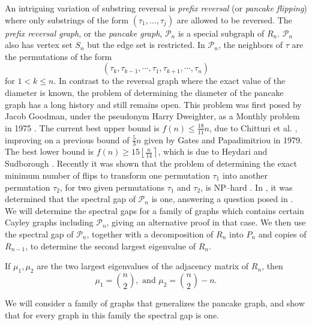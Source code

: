  An intriguing variation of substring reversal is  {\it prefix reversal} (or {\it pancake flipping}) where only
 substrings of the form $(\tau_1, \ldots, \tau_j)$ are allowed to be reversed.
The \textit{prefix reversal graph}, or  the \textit{pancake graph}, $\mathcal{P}_n$ 
is a special subgraph of $R_n$.  ${\mathcal P}_n$  also has vertex set $S_n$  but
the edge set is  restricted. In $\mathcal{P}_n$, the 
neighbors of $\tau$ are the permutations of the form  
 \[ (\tau_k, \tau_{k-1}, \cdots, \tau_1, \tau_{k+1}, \cdots, \tau_n) \]
for $1 < k \leq n$.
 In contrast to the reversal graph
where the exact value of the diameter is known, the problem of determining the diameter of the pancake  
graph has a long history and still remains open.
This problem was first posed by Jacob Goodman, under the pseudonym Harry Dweighter, as a Monthly problem
in 1975 \cite{Dweighter1975}.
The current best upper bound is $f(n) \leq \frac{18}{11} n $, due to
Chitturi et al. \cite{ChitturiEtAl2009}, improving on a previous bound of $\frac{5}{3} n$ given by
 Gates and Papadimitriou \cite{GatesPapadimitriou1979} in 1979.  The best lower bound is
$f(n) \geq 15 \left\lfloor \frac{n}{14} \right\rceil$, which is due to 
Heydari and Sudborough \cite{HeydariSudborough1997}.  Recently it was shown that the problem of  determining the exact minimum number of flips
to transform  one permutation $\tau_1$ into another permutation $\tau_2$, for two
given permutations $\tau_1$ and $\tau_2$, is NP--hard \cite{BulteauEtAl2015}.
  In \cite{Cesi2009}, it 
was determined that the spectral gap of $\mathcal{P}_n$ is one, answering a 
question posed in \cite{GunnellsEtAl2007}.
We will determine the spectral gaps for a family of graphs which contains certain Cayley graphs
including $\mathcal{P}_n$, giving an alternative proof in that case.
We then use the spectral gap of $\mathcal{P}_n$, together with a decomposition of $R_n$
into $P_n$ and copies of $R_{n-1}$, to determine the second largest
eigenvalue of $R_n$.


\begin{theorem}\label{thm:rev_eig}
 If $\mu_1, \mu_2$ are the two largest eigenvalues of the adjacency matrix
 of $R_n$, then  
 \[  \mu_1 = \binom{n}{2}, \text{ and } \mu_2 = \binom{n}{2}-n. \]
\end{theorem}



We will consider a family of graphs that generalizes the pancake graph, 
and show that for every graph in this family the spectral gap is one. 

